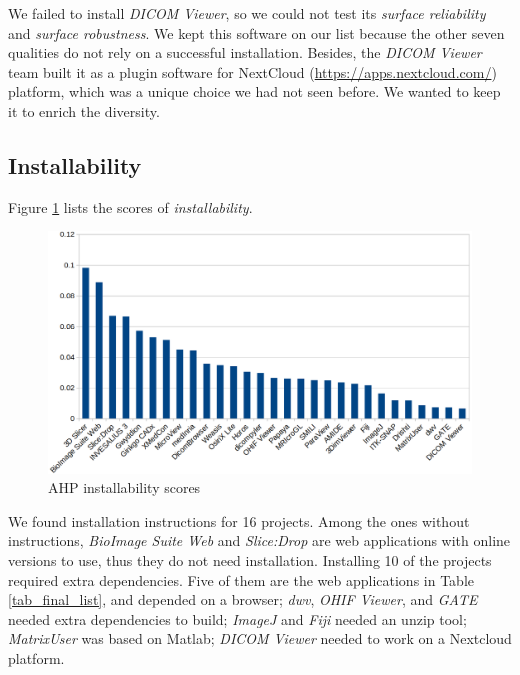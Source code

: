 \documentclass[3p, 12pt,authoryear]{elsarticle}
\begin{document}
We failed to install \textit{DICOM Viewer}, so we could not test its
\textit{surface reliability} and \textit{surface robustness}. We kept this
software on our list because the other seven qualities do not rely on a
successful installation. Besides, the \textit{DICOM Viewer} team built it as a
plugin software for NextCloud
(\hyperlink{https://apps.nextcloud.com/}{https://apps.nextcloud.com/}) platform,
which was a unique choice we had not seen before. We wanted to keep it to enrich
the diversity.

\subsection{Installability} \label{sec_result_installability}

Figure \ref{fg_installability_scores} lists the scores of
\textit{installability}.

\begin{figure}[ht]
\includegraphics[scale=0.38]{figures/installability_scores.png}
\caption{AHP installability scores}
\label{fg_installability_scores}
\end{figure}

We found installation instructions for 16 projects. Among the ones without
instructions, \textit{BioImage Suite Web} and \textit{Slice:Drop} are web
applications with online versions to use, thus they do not need installation.
Installing 10 of the projects required extra dependencies. Five of them are the
web applications in Table \ref{tab_final_list}, and depended on a browser;
\textit{dwv}, \textit{OHIF Viewer}, and \textit{GATE} needed extra dependencies
to build; \textit{ImageJ} and	\textit{Fiji} needed an unzip tool;
\textit{MatrixUser} was based on Matlab; \textit{DICOM Viewer} needed to work on
a Nextcloud platform.
\end{document}
